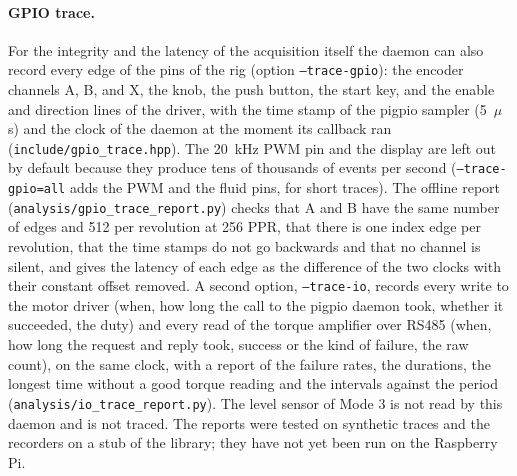 \paragraph{GPIO trace.}
For the integrity and the latency of the acquisition itself the daemon can also record every edge of the pins of the rig (option \texttt{--trace-gpio}): the encoder channels A, B, and X, the knob, the push button, the start key, and the enable and direction lines of the driver, with the time stamp of the pigpio sampler (5~$\mu$s) and the clock of the daemon at the moment its callback ran (\texttt{include/gpio\_trace.hpp}). The 20~kHz PWM pin and the display are left out by default because they produce tens of thousands of events per second (\texttt{--trace-gpio=all} adds the PWM and the fluid pins, for short traces). The offline report (\texttt{analysis/gpio\_trace\_report.py}) checks that A and B have the same number of edges and 512 per revolution at 256 PPR, that there is one index edge per revolution, that the time stamps do not go backwards and that no channel is silent, and gives the latency of each edge as the difference of the two clocks with their constant offset removed. A second option, \texttt{--trace-io}, records every write to the motor driver (when, how long the call to the pigpio daemon took, whether it succeeded, the duty) and every read of the torque amplifier over RS485 (when, how long the request and reply took, success or the kind of failure, the raw count), on the same clock, with a report of the failure rates, the durations, the longest time without a good torque reading and the intervals against the period (\texttt{analysis/io\_trace\_report.py}). The level sensor of Mode 3 is not read by this daemon and is not traced. The reports were tested on synthetic traces and the recorders on a stub of the library; they have not yet been run on the Raspberry Pi. %

